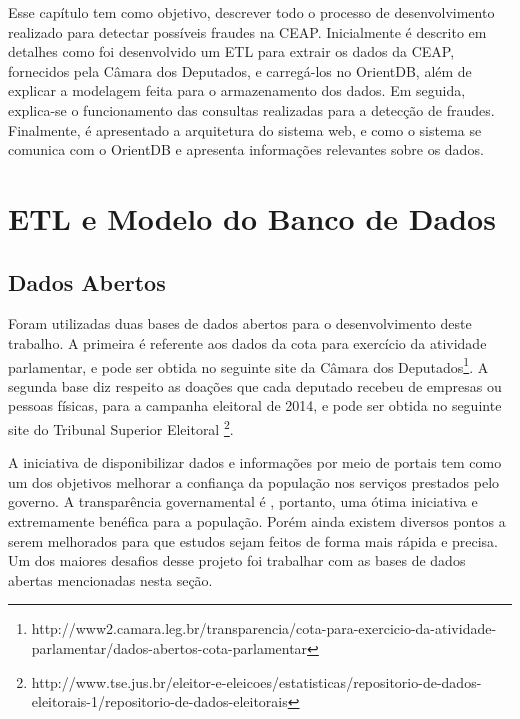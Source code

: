 	Esse capítulo tem como objetivo, descrever todo o processo de desenvolvimento realizado para detectar possíveis fraudes na CEAP. Inicialmente é descrito em detalhes como foi desenvolvido um ETL para extrair os dados da CEAP, fornecidos pela Câmara dos Deputados, e carregá-los no OrientDB, além de explicar a modelagem feita para o armazenamento dos dados. Em seguida, explica-se o funcionamento das consultas realizadas para a detecção de fraudes. Finalmente, é apresentado a arquitetura do sistema web, e como o sistema se comunica com o OrientDB e apresenta informações relevantes sobre os dados.

\section{ETL e Modelo do Banco de Dados}

\subsection{Dados Abertos}

Foram utilizadas duas bases de dados abertos para o desenvolvimento deste trabalho. A primeira é referente aos dados da cota para exercício da atividade parlamentar, e pode ser obtida no seguinte site da Câmara dos Deputados\footnote{http://www2.camara.leg.br/transparencia/cota-para-exercicio-da-atividade-parlamentar/dados-abertos-cota-parlamentar}. A segunda base diz respeito as doações que cada deputado recebeu de empresas ou pessoas físicas, para a campanha eleitoral de 2014, e pode ser obtida no seguinte site do Tribunal Superior Eleitoral \footnote{http://www.tse.jus.br/eleitor-e-eleicoes/estatisticas/repositorio-de-dados-eleitorais-1/repositorio-de-dados-eleitorais}.

A iniciativa de disponibilizar dados e informações por meio de portais tem como um dos objetivos melhorar a confiança da população nos serviços prestados pelo governo. A transparência governamental é , portanto, uma ótima iniciativa e extremamente benéfica para a população. Porém ainda existem diversos pontos a serem melhorados para que estudos sejam feitos de forma mais rápida e precisa. Um dos maiores desafios desse projeto foi trabalhar com as bases de dados abertas mencionadas nesta seção.

